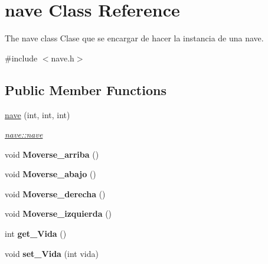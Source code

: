 \hypertarget{classnave}{\section{nave Class Reference}
\label{classnave}
}


The nave class Clase que se encargar de hacer la instancia de una nave.  




{\ttfamily \#include $<$nave.\+h$>$}

\subsection*{Public Member Functions}
\begin{DoxyCompactItemize}
\item 
\hyperlink{classnave_a8bacfc8f9a6084056d4225f019fec189}{nave} (int, int, int)
\begin{DoxyCompactList}\small\item\em \hyperlink{classnave_a8bacfc8f9a6084056d4225f019fec189}{nave\+::nave} \end{DoxyCompactList}\item 
\hypertarget{classnave_ab18b97fbf7a2754ef96f1dd2034fb3c3}{void {\bfseries Moverse\+\_\+arriba} ()}\label{classnave_ab18b97fbf7a2754ef96f1dd2034fb3c3}

\item 
\hypertarget{classnave_a20edce5f2a8c2ec2c20b5c9716c2106d}{void {\bfseries Moverse\+\_\+abajo} ()}\label{classnave_a20edce5f2a8c2ec2c20b5c9716c2106d}

\item 
\hypertarget{classnave_a8f3d73632fc16266855fd2cab2abd90e}{void {\bfseries Moverse\+\_\+derecha} ()}\label{classnave_a8f3d73632fc16266855fd2cab2abd90e}

\item 
\hypertarget{classnave_a2dcef95d2e45022b909466e53d8e7f23}{void {\bfseries Moverse\+\_\+izquierda} ()}\label{classnave_a2dcef95d2e45022b909466e53d8e7f23}

\item 
\hypertarget{classnave_a3243800568f85fc75ef3f82f35c52d44}{int {\bfseries get\+\_\+\+Vida} ()}\label{classnave_a3243800568f85fc75ef3f82f35c52d44}

\item 
\hypertarget{classnave_a6cae4804c09d2c101bf412bc290f61f7}{void {\bfseries set\+\_\+\+Vida} (int vida)}\label{classnave_a6cae4804c09d2c101bf412bc290f61f7}


\end{DoxyCompactItemize}
